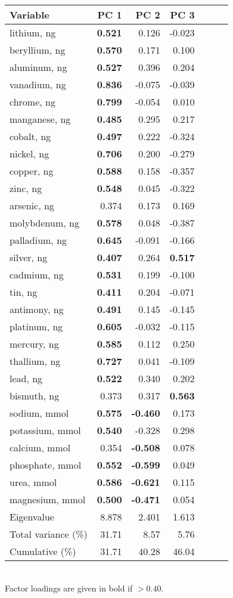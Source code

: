\begin{table}
\centering
{}
\begin{tabular}{lrrrrrr}
\toprule
Variable & PC 1 & PC 2 & PC 3 \\
\midrule
lithium, ng&\textbf{0.521}&0.126&-0.023\\
beryllium, ng&\textbf{0.570}&0.171&0.100\\
aluminum, ng&\textbf{0.527}&0.396&0.204\\
vanadium, ng&\textbf{0.836}&-0.075&-0.039\\
chrome, ng&\textbf{0.799}&-0.054&0.010\\
manganese, ng&\textbf{0.485}&0.295&0.217\\
cobalt, ng&\textbf{0.497}&0.222&-0.324\\
nickel, ng&\textbf{0.706}&0.200&-0.279\\
copper, ng&\textbf{0.588}&0.158&-0.357\\
zinc, ng&\textbf{0.548}&0.045&-0.322\\
arsenic, ng&0.374&0.173&0.169\\
molybdenum, ng&\textbf{0.578}&0.048&-0.387\\
palladium, ng&\textbf{0.645}&-0.091&-0.166\\
silver, ng&\textbf{0.407}&0.264&\textbf{0.517}\\
cadmium, ng&\textbf{0.531}&0.199&-0.100\\
tin, ng&\textbf{0.411}&0.204&-0.071\\
antimony, ng&\textbf{0.491}&0.145&-0.145\\
platinum, ng&\textbf{0.605}&-0.032&-0.115\\
mercury, ng&\textbf{0.585}&0.112&0.250\\
thallium, ng&\textbf{0.727}&0.041&-0.109\\
lead, ng&\textbf{0.522}&0.340&0.202\\
bismuth, ng&0.373&0.317&\textbf{0.563}\\
sodium, mmol&\textbf{0.575}&\textbf{-0.460}&0.173\\
potassium, mmol&\textbf{0.540}&-0.328&0.298\\
calcium, mmol&0.354&\textbf{-0.508}&0.078\\
phosphate, mmol&\textbf{0.552}&\textbf{-0.599}&0.049\\
urea, mmol&\textbf{0.586}&\textbf{-0.621}&0.115\\
magnesium, mmol&\textbf{0.500}&\textbf{-0.471}&0.054\\
\midrule
Eigenvalue & 8.878 & 2.401 & 1.613 \\
Total variance (\%) & 31.71 & 8.57 &  5.76 \\
Cumulative (\%) & 31.71 &  40.28 & 46.04 \\
\bottomrule
\end{tabular}
\label{table:floadings} \\
{\footnotesize Factor loadings are given in bold if $>0.40$.}
\end{table}

